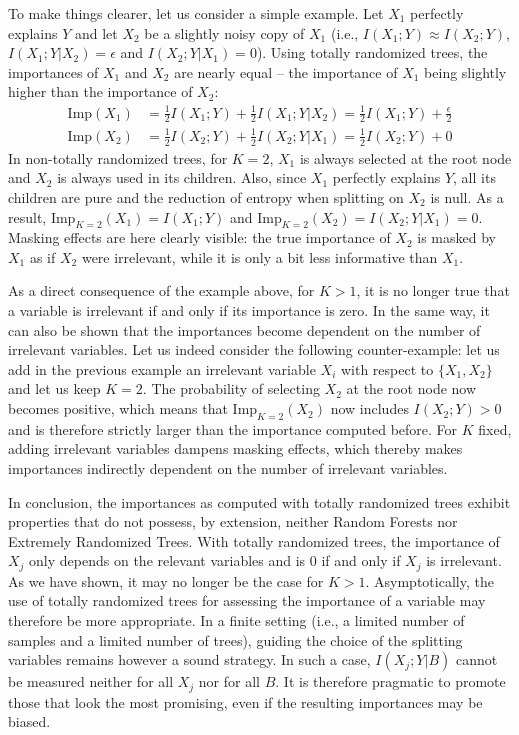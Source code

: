 To make things clearer, let us consider a simple example. Let $X_1$ perfectly explains $Y$
 and let $X_2$ be a slightly noisy copy of $X_1$ (i.e., $I(X_1;Y)
\approx I(X_2;Y)$, $I(X_1;Y|X_2)=\epsilon$ and $I(X_2;Y|X_1)=0$). Using totally
randomized trees, the importances of $X_1$ and $X_2$ are nearly equal -- the
importance of $X_1$ being slightly higher than the importance of $X_2$:
\begin{align}
\text{Imp}(X_1) &= \frac{1}{2} I(X_1;Y) + \frac{1}{2} I(X_1;Y|X_2) = \frac{1}{2} I(X_1;Y) + \frac{\epsilon}{2}\\
\text{Imp}(X_2) &= \frac{1}{2} I(X_2;Y) + \frac{1}{2} I(X_2;Y|X_1) = \frac{1}{2} I(X_2;Y) + 0
\end{align}
In non-totally randomized trees, for $K=2$, $X_1$ is always selected at the root
node and $X_2$ is always used in its children. Also, since $X_1$ perfectly
explains $Y$, all its children are pure and the reduction of entropy when
splitting on $X_2$ is null. As a result, $\text{Imp}_{K=2}(X_1) = I(X_1;Y)$ and
$\text{Imp}_{K=2}(X_2) = I(X_2;Y|X_1) = 0$. Masking effects are here
clearly visible: the true importance of $X_2$ is masked by $X_1$ as if $X_2$
were irrelevant, while it is only a bit less informative than $X_1$.

As a direct consequence of the example above, for $K>1$, it is no longer true
that a variable is irrelevant if and only if its importance is zero. In the same
way, it can also be shown that the importances become dependent on the number of
irrelevant variables. Let us indeed consider the following counter-example: let
us add in the previous example an irrelevant variable $X_i$ with respect to
$\{X_1, X_2\}$ and let us keep $K=2$. The probability of selecting $X_2$ at the
root node now becomes positive, which means that $\text{Imp}_{K=2}(X_2)$ now includes
$I(X_2;Y)>0$ and is therefore strictly larger than the importance computed
before. For $K$ fixed, adding irrelevant variables dampens masking effects,
which thereby makes importances indirectly dependent on the number of irrelevant
variables.

In conclusion, the importances as computed with totally randomized trees
exhibit properties that do not possess, by extension, neither Random Forests nor
Extremely Randomized Trees. With totally randomized trees, the importance of
$X_j$ only depends on the relevant variables and is 0 if and only if $X_j$ is
irrelevant. As we have shown, it may no longer be the case for $K>1$.
Asymptotically, the use of totally randomized trees for assessing the importance of
a variable may therefore be more appropriate. In a finite setting (i.e., a
limited number of samples and a limited number of trees), guiding the choice of
the splitting variables remains however a sound strategy. In such a case,
$I(X_j;Y|B)$ cannot be measured neither for all $X_j$ nor for all $B$. It is
therefore  pragmatic to promote those that look the most promising, even if
the resulting importances may be biased.

